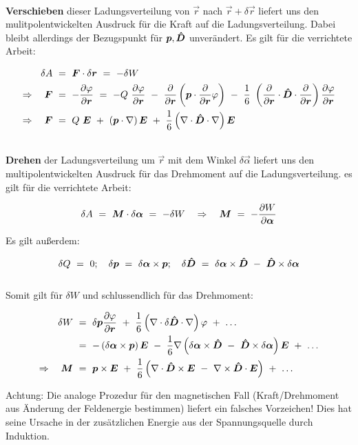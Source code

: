 \ \\
\textbf{Verschieben} dieser Ladungsverteilung von $\vec{r}$ nach $\vec{r} + \delta\vec{r}$ liefert uns den mulitpolentwickelten Ausdruck für die Kraft auf die Ladungsverteilung. Dabei bleibt allerdings der Bezugspunkt für $\bm{p},\bm{\hat{D}}$ unverändert. Es gilt für die verrichtete Arbeit:

\begin{align*}
\delta A \ &= \ \vec{F} \cdot \delta\vec{r} \ = \ -\delta W \\
\Rightarrow \quad \vec{F}  \ &= \  -\pdiff{\varphi}{\vec{r}}  \ = \ -Q\ \pdiff{\varphi}{\vec{r}} \ - \ \pdiff{}{\vec{r}} \left(\vec{p}\cdot\pdiff{}{\vec{r}}\varphi\right) \ - \ \frac{1}{6} \ \left(\pdiff{}{\vec{r}}\cdot\tens{D}\cdot\pdiff{}{\vec{r}}\right)\pdiff{\varphi}{\vec{r}}\\
\Rightarrow \quad \vec{F} \ &= \ Q \ \vec{E} \ + \ \left(\vec{p}\cdot\nabla\right)\vec{E} \ + \ \frac{1}{6}\left(\nabla\cdot\tens{D}\cdot\nabla\right)\vec{E}
\end{align*}

\ \\
\textbf{Drehen} der Ladungsverteilung um $\vec{r}$ mit dem Winkel $\delta\vec{\alpha}$ liefert uns den multipolentwickelten Ausdruck für das Drehmoment auf die Ladungsverteilung. es gilt für die verrichtete Arbeit:

\begin{equation*}
\delta A  \ = \ \vec{M}\cdot\delta\vec{\alpha}  \ = \ - \delta W \quad\Rightarrow \quad \vec{M}  \ = \ - \pdiff{W}{\vec{\alpha}}
\end{equation*}

Es gilt außerdem:

\begin{equation*}
\delta Q  \ = \ 0 ; \quad \delta\vec{p}  \ = \  \delta\vec{\alpha}\times\vec{p}; \quad \delta\tens{D}  \ = \ \delta\vec{\alpha}\times\tens{D} \ - \ \tens{D}\times\delta\vec{\alpha}
\end{equation*}
\ \\

Somit gilt für $\delta W$ und schlussendlich für das Drehmoment:

\begin{align*}
\delta W  \ &= \  \delta\vec{p} \pdiff{\varphi}{\vec{r}} \ + \ \frac{1}{6}\left(\nabla\cdot\delta\tens{D}\cdot\nabla\right)\varphi \ + \ \ldots\\
&= \ - \left(\delta\vec{\alpha}\times\vec{p}\right)\vec{E} \ - \ \frac{1}{6}\nabla\left(\delta\vec{\alpha}\times\tens{D} \ - \ \tens{D} \times\delta\vec{\alpha}\right)\vec{E} \ +  \ \ldots\\
\Rightarrow\quad \vec{M} \ &= \ \vec{p}\times\vec{E} \ + \ \frac{1}{6}\left(\nabla\cdot\tens{D}\times\vec{E} \ - \ \nabla\times\tens{D}\cdot\vec{E}\right) \ + \ \ldots
\end{align*}

Achtung: Die analoge Prozedur für den magnetischen Fall (Kraft/Drehmoment aus Änderung der Feldenergie bestimmen) liefert ein falsches Vorzeichen! Dies hat seine Ursache in der zusätzlichen Energie aus der Spannungsquelle durch Induktion.